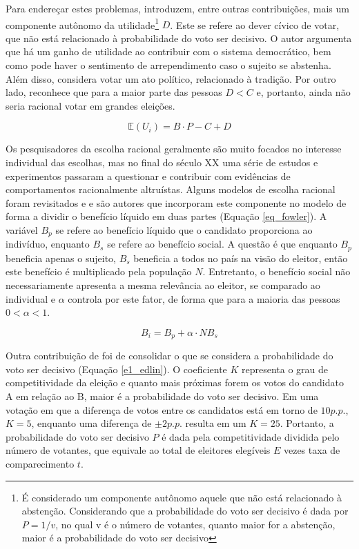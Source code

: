 Para endereçar estes problemas, \textcite{riker1968theory} introduzem, entre outras contribuições, mais um componente autônomo da utilidade\footnote{É considerado um componente autônomo aquele que não está relacionado à abstenção. Considerando que a probabilidade do voto ser decisivo é dada por $P = 1/v$, no qual v é o número de votantes, quanto maior for a abstenção, maior é a probabilidade do voto ser decisivo}
$D$. Este se refere ao dever cívico de votar, que não está relacionado à probabilidade do voto ser decisivo. O autor argumenta que há um ganho de utilidade ao contribuir com o sistema democrático, bem como pode haver o sentimento de arrependimento caso o sujeito se abstenha. Além disso, considera votar um ato político, relacionado à tradição. Por outro lado, reconhece que para a maior parte das pessoas $D<C$ e, portanto, ainda não seria racional votar em grandes eleições.

\begin{equation}
\label{eq_riker}
    \mathbb{E}(U_i)=B\cdot P-C+D
\end{equation}

Os pesquisadores da escolha racional geralmente são muito focados no interesse individual das escolhas, mas no final do século XX uma série de estudos e experimentos passaram a questionar e contribuir com evidências de comportamentos racionalmente altruístas. Alguns modelos de escolha racional foram revisitados e \textcite{fowler2006altruism} e \textcite{edlin2007voting} são autores que incorporam este componente no modelo de forma a dividir o benefício líquido em duas partes (Equação \ref{eq_fowler}). A variável $B_p$ se refere ao benefício líquido que o candidato proporciona ao indivíduo, enquanto $B_s$ se refere ao benefício social. A questão é que enquanto $B_p$ beneficia apenas o sujeito, $B_s$ beneficia a todos no país na visão do eleitor, então este benefício é multiplicado pela população $N$. Entretanto, o benefício social não necessariamente apresenta a mesma relevância ao eleitor, se comparado ao individual e $\alpha$ controla por este fator, de forma que para a maioria das pessoas $0<\alpha < 1$.

\begin{equation}
\label{eq_fowler}
    B_i = B_p + \alpha\cdot NB_s
\end{equation}

Outra contribuição de \textcite{edlin2007voting} foi de consolidar o que se considera a probabilidade do voto ser decisivo (Equação \ref{e1_edlin}). O coeficiente $K$ representa o grau de competitividade da eleição e quanto mais próximas forem os votos do candidato A em relação ao B, maior é a probabilidade do voto ser decisivo. Em uma votação em que a diferença de votos entre os candidatos está em torno de $10p.p$., $K=5$, enquanto uma diferença de $\pm 2p.p.$ resulta em um $K=25$. Portanto, a probabilidade do voto ser decisivo $P$ é dada pela competitividade dividida pelo número de votantes, que equivale ao total de eleitores elegíveis $E$ vezes taxa de comparecimento $t$.

